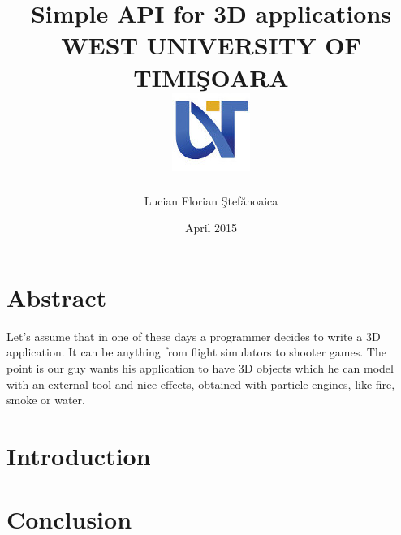 \documentclass[a4paper, 12pt]{report}
\title{
	{Simple API for 3D applications}\\
	\vspace{2.5cm}
	{\large WEST UNIVERSITY OF TIMI\c SOARA}\\
	{\includegraphics{uvt_logo.jpg}}
}
\author{Lucian Florian \c Stef\u anoaica}
\date{April 2015}
\begin{document}


\chapter*{Abstract}
Let's assume that in one of these days a programmer decides to write a 3D application. It can be anything from flight simulators to shooter games. The point is our guy wants his application to have 3D objects which he can model with an external tool and nice effects, obtained with particle engines, like fire, smoke or water.

\tableofcontents

\chapter{Introduction}

\chapter{Conclusion}


\end{document}
